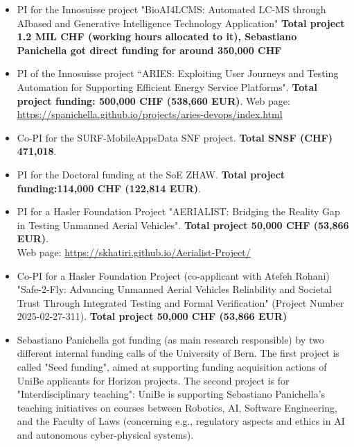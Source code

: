 \documentclass[11pt]{article}
\begin{document}
\begin{itemize}
\vspace{-2.5mm}
\item PI for the Innosuisse project  "BioAI4LCMS: Automated LC-MS through AIbased and Generative Intelligence Technology Application" \textbf{Total project 1.2 MIL CHF (working hours allocated to it), Sebastiano Panichella got direct funding for around 350,000 CHF}
\vspace{-2.5mm}
  \item PI of the Innosuisse project ``ARIES: Exploiting User Journeys and Testing Automation for Supporting Efficient Energy Service Platforms". \textbf{Total project funding: \textbf{500,000 CHF} (538,660 EUR)}. Web page: \href{https://spanichella.github.io/projects/aries-devops/index.html}{https://spanichella.github.io/projects/aries-devops/index.html}
\vspace{-2.5mm}
  \item Co-PI for
   the SURF-MobileAppsData SNF project. \textbf{Total SNSF (CHF) 471,018}. 
\vspace{-2.5mm}
   \item PI for the Doctoral funding at the SoE ZHAW. \textbf{Total project funding:\textbf{114,000 CHF} (122,814 EUR)}.
\vspace{-2.5mm}
  \item PI for a Hasler Foundation Project "AERIALIST: Bridging the Reality Gap in Testing Unmanned Aerial Vehicles".  
\textbf{Total project 50,000 CHF (53,866 EUR)}. \\Web page: \href{https://skhatiri.github.io/Aerialist-Project/}{https://skhatiri.github.io/Aerialist-Project/} 
\vspace{-2.5mm}
  \item Co-PI for a Hasler Foundation Project (co-applicant with Atefeh Rohani) "Safe-2-Fly: Advancing Unmanned Aerial Vehicles Reliability and Societal Trust Through Integrated Testing and Formal Verification" (Project Number 2025-02-27-311).
\textbf{Total project 50,000 CHF (53,866 EUR)} 
\vspace{-2.5mm}
  \item Sebastiano Panichella got funding (as main research responsible) by two different internal funding calls of the University of Bern. 
The first project is called "Seed funding", aimed at supporting funding acquisition actions of UniBe applicants for Horizon projects.
The second project is for "Interdisciplinary teaching": UniBe is supporting Sebastiano Panichella's teaching initiatives on courses between Robotics, AI, Software Engineering, and the Faculty of Laws (concerning e.g., regulatory aspects and ethics in AI and autonomous cyber-physical systems).

\end{itemize}
\end{document}
